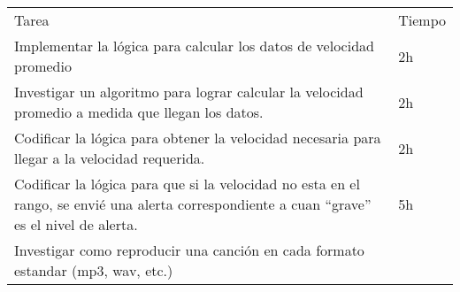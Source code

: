 \begin{enumerate}
  \begin{longtable}[c]{@{}ll@{}}
  \hline\noalign{\medskip}
  \begin{minipage}[b]{0.92\columnwidth}\raggedright
  Tarea
  \end{minipage} & \begin{minipage}[b]{0.08\columnwidth}\raggedright
  Tiempo
  \end{minipage}
  \\\noalign{\medskip}
  \hline\noalign{\medskip}
  \begin{minipage}[t]{0.92\columnwidth}\raggedright
  Implementar la lógica para calcular los datos de velocidad promedio
  \end{minipage} & \begin{minipage}[t]{0.08\columnwidth}\raggedright
  2h
  \end{minipage}
  \\\noalign{\medskip}
  \begin{minipage}[t]{0.92\columnwidth}\raggedright
  Investigar un algoritmo para lograr calcular la velocidad promedio a
  medida que llegan los datos.
  \end{minipage} & \begin{minipage}[t]{0.08\columnwidth}\raggedright
  2h
  \end{minipage}
  \\\noalign{\medskip}
  \begin{minipage}[t]{0.92\columnwidth}\raggedright
  Codificar la lógica para obtener la velocidad necesaria para llegar a
  la velocidad requerida.
  \end{minipage} & \begin{minipage}[t]{0.08\columnwidth}\raggedright
  2h
  \end{minipage}
  \\\noalign{\medskip}
  \begin{minipage}[t]{0.92\columnwidth}\raggedright
  Codificar la lógica para que si la velocidad no esta en el rango, se
  envié una alerta correspondiente a cuan ``grave'' es el nivel de
  alerta.
  \end{minipage} & \begin{minipage}[t]{0.08\columnwidth}\raggedright
  5h
  \end{minipage}
  \\\noalign{\medskip}
  \begin{minipage}[t]{0.92\columnwidth}\raggedright
  Investigar como reproducir una canción en cada formato estandar (mp3,
  wav, etc.)
  \end{minipage} & \begin{minipage}[t]{0.08\columnwidth}\raggedright

\end{minipage}
\end{longtable}
\end{enumerate}
